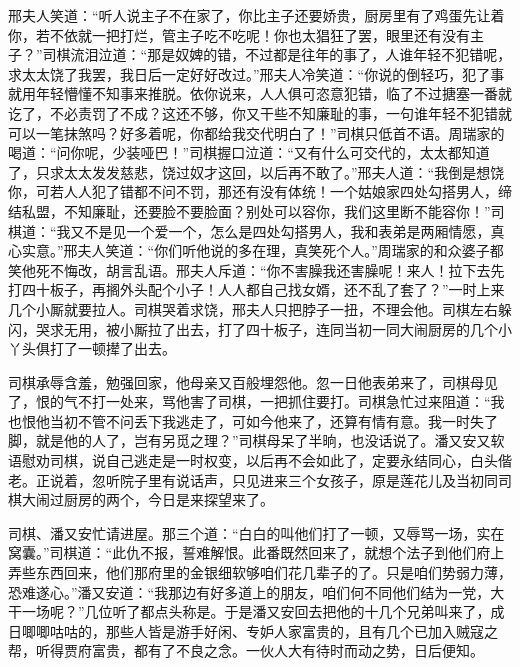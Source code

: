 \documentclass[12pt,oneside]{book}
\begin{document}
邢夫人笑道：“听人说主子不在家了，你比主子还要娇贵，厨房里有了鸡蛋先让着你，若不依就一把打烂，管主子吃不吃呢！你也太猖狂了罢，眼里还有没有主子？”司棋流泪泣道：“那是奴婢的错，不过都是往年的事了，人谁年轻不犯错呢，求太太饶了我罢，我日后一定好好改过。”邢夫人冷笑道：“你说的倒轻巧，犯了事就用年轻懵懂不知事来推脱。依你说来，人人俱可恣意犯错，临了不过搪塞一番就讫了，不必责罚了不成？这还不够，你又干些不知廉耻的事，一句谁年轻不犯错就可以一笔抹煞吗？好多着呢，你都给我交代明白了！”司棋只低首不语。周瑞家的喝道：“问你呢，少装哑巴！”司棋握口泣道：“又有什么可交代的，太太都知道了，只求太太发发慈悲，饶过奴才这回，以后再不敢了。”邢夫人道：“我倒是想饶你，可若人人犯了错都不问不罚，那还有没有体统！一个姑娘家四处勾搭男人，缔结私盟，不知廉耻，还要脸不要脸面？别处可以容你，我们这里断不能容你！”司棋道：“我又不是见一个爱一个，怎么是四处勾搭男人，我和表弟是两厢情愿，真心实意。”邢夫人笑道：“你们听他说的多在理，真笑死个人。”周瑞家的和众婆子都笑他死不悔改，胡言乱语。邢夫人斥道：“你不害臊我还害臊呢！来人！拉下去先打四十板子，再搁外头配个小子！人人都自己找女婿，还不乱了套了？”一时上来几个小厮就要拉人。司棋哭着求饶，邢夫人只把脖子一扭，不理会他。司棋左右躲闪，哭求无用，被小厮拉了出去，打了四十板子，连同当初一同大闹厨房的几个小丫头俱打了一顿撵了出去。

司棋承辱含羞，勉强回家，他母亲又百般埋怨他。忽一日他表弟来了，司棋母见了，恨的气不打一处来，骂他害了司棋，一把抓住要打。司棋急忙过来阻道：“我也恨他当初不管不问丢下我逃走了，可如今他来了，还算有情有意。我一时失了脚，就是他的人了，岂有另觅之理？”司棋母呆了半晌，也没话说了。潘又安又软语慰劝司棋，说自己逃走是一时权变，以后再不会如此了，定要永结同心，白头偕老。正说着，忽听院子里有说话声，只见进来三个女孩子，原是莲花儿及当初同司棋大闹过厨房的两个，今日是来探望来了。

司棋、潘又安忙请进屋。那三个道：“白白的叫他们打了一顿，又辱骂一场，实在窝囊。”司棋道：“此仇不报，誓难解恨。此番既然回来了，就想个法子到他们府上弄些东西回来，他们那府里的金银细软够咱们花几辈子的了。只是咱们势弱力薄，恐难遂心。”潘又安道：“我那边有好多道上的朋友，咱们何不同他们结为一党，大干一场呢？”几位听了都点头称是。于是潘又安回去把他的十几个兄弟叫来了，成日唧唧咕咕的，那些人皆是游手好闲、专妒人家富贵的，且有几个已加入贼寇之帮，听得贾府富贵，都有了不良之念。一伙人大有待时而动之势，日后便知。
\end{document}
